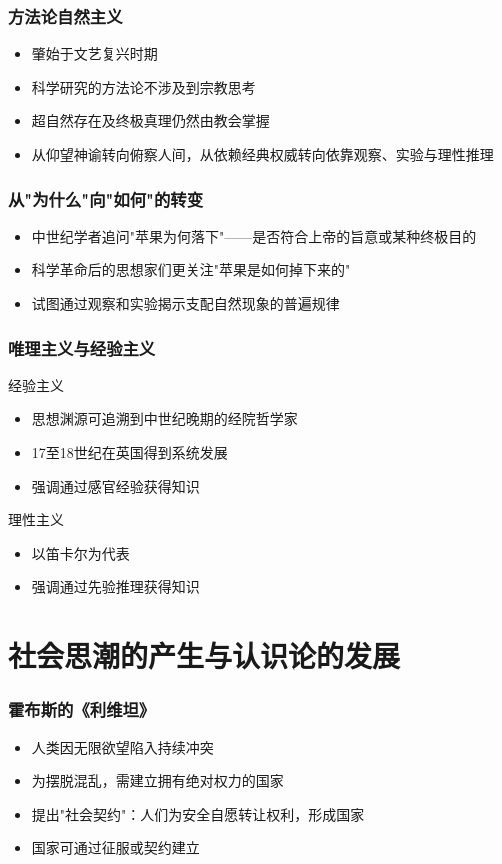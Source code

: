 \documentclass{beamer}
\begin{document}
\begin{frame}
\frametitle{方法论自然主义}
\begin{itemize}
\item 肇始于文艺复兴时期
\item 科学研究的方法论不涉及到宗教思考
\item 超自然存在及终极真理仍然由教会掌握
\item 从仰望神谕转向俯察人间，从依赖经典权威转向依靠观察、实验与理性推理
\end{itemize}
\end{frame}

\begin{frame}
\frametitle{从"为什么"向"如何"的转变}
\begin{itemize}
\item 中世纪学者追问"苹果为何落下"------是否符合上帝的旨意或某种终极目的
\item 科学革命后的思想家们更关注"苹果是如何掉下来的"
\item 试图通过观察和实验揭示支配自然现象的普遍规律
\end{itemize}
\end{frame}

\begin{frame}
\frametitle{唯理主义与经验主义}
\begin{block}{经验主义}
\begin{itemize}
\item 思想渊源可追溯到中世纪晚期的经院哲学家
\item 17至18世纪在英国得到系统发展
\item 强调通过感官经验获得知识
\end{itemize}
\end{block}

\begin{block}{理性主义}
\begin{itemize}
\item 以笛卡尔为代表
\item 强调通过先验推理获得知识
\end{itemize}
\end{block}
\end{frame}

\section{社会思潮的产生与认识论的发展}
\begin{frame}
\frametitle{霍布斯的《利维坦》}
\begin{itemize}
\item 人类因无限欲望陷入持续冲突
\item 为摆脱混乱，需建立拥有绝对权力的国家
\item 提出"社会契约"：人们为安全自愿转让权利，形成国家
\item 国家可通过征服或契约建立
\end{itemize}
\end{frame}
\end{document}
